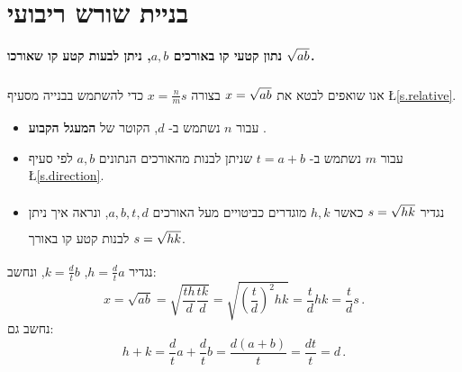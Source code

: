 \documentclass[12pt,a4paper]{article}
\newcommand*{\disfrac}[2]{\displaystyle\frac{#1}{#2}}
\begin{document}
\section{%
בניית שורש ריבועי%
}\label{s.root}

\textbf{%
נתון קטעי קו באורכים
$a,b$,
ניתן לבעות קטע קו שאורכו
$\rule[-5pt]{0pt}{10pt}\sqrt{ab}$.}

אנו שואפים לבטא את
$\rule[-5pt]{0pt}{20pt}x=\sqrt{ab}$
בצורה
$x=\frac{n}{m}s$
כדי להשתמש בבנייה מסעיף
\L{\ref{s.relative}}.
\vspace*{-8pt}
\begin{itemize}
\item עבור
$n$
נשתמש ב-%
$d$,
הקוטר של
\textbf{%
המעגל הקבוע%
}.
\item עבור
$m$
נשתמש ב-%
$t=a+b$
שניתן לבנות מהאורכים הנתונים
$a,b$
לפי סעיף
\L{\ref{s.direction}}.
\item 
נגדיר
$\rule[-5pt]{0pt}{20pt}s=\sqrt{hk}$
כאשר 
$h,k$
מוגדרים כביטויים מעל האורכים
$a,b,t,d$,
ונראה איך ניתן לבנות קטע קו באורך 
$\rule[-5pt]{0pt}{20pt}s=\sqrt{hk}$.
\end{itemize}
נגדיר
$h=\disfrac{d}{t}a$, $k=\disfrac{d}{t}b$,
ונחשב:
\[
x=\sqrt{ab}=\sqrt{\frac{th}{d}\frac{tk}{d}}=\sqrt{\left(\frac{t}{d}\right)^2hk}=\frac{t}{d}hk=\frac{t}{d}s\,.
\]
נחשב גם: 
\[
h+k = \frac{d}{t}a + \frac{d}{t}b = \frac{d(a+b)}{t} = \frac{dt}{t} = d\,.
\]
\end{document}
